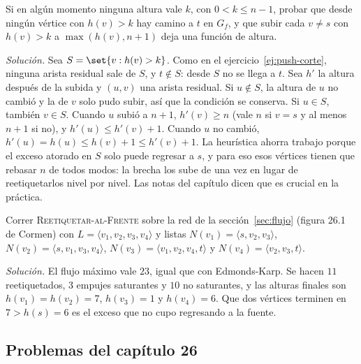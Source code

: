 \documentclass[11pt,letterpaper]{article}
\begin{document}
\begin{ejercicio}
  \label{ej:push-brecha}
  Si en algún momento ninguna altura vale $k$, con $0 < k \le n - 1$,
  probar que desde ningún vértice con $h(v) > k$ hay camino a $t$ en
  $G_f$, y que subir cada $v \neq s$ con $h(v) > k$ a
  $\max(h(v), n + 1)$ deja una función de altura.

  \textit{Solución.} Sea $S = \set{v : h(v) > k}$. Como en el
  ejercicio~\ref{ej:push-corte}, ninguna arista residual sale de $S$, y
  $t \notin S$: desde $S$ no se llega a $t$. Sea $h'$ la altura después
  de la subida y $(u, v)$ una arista residual. Si $u \notin S$, la
  altura de $u$ no cambió y la de $v$ solo pudo subir, así que la
  condición se conserva. Si $u \in S$, también $v \in S$. Cuando $u$
  subió a $n + 1$, $h'(v) \ge n$ (vale $n$ si $v = s$ y al menos
  $n + 1$ si no), y $h'(u) \le h'(v) + 1$. Cuando $u$ no cambió,
  $h'(u) = h(u) \le h(v) + 1 \le h'(v) + 1$. La heurística ahorra
  trabajo porque el exceso atorado en $S$ solo puede regresar a $s$, y
  para eso esos vértices tienen que rebasar $n$ de todos modos: la
  brecha los sube de una vez en lugar de reetiquetarlos nivel por
  nivel. Las notas del capítulo dicen que es crucial en la práctica.
\end{ejercicio}

\begin{ejercicio}[Cormen, 26.5-1]
  Correr \textsc{Reetiquetar-al-Frente} sobre la red de la
  sección~\ref{sec:flujo} (figura 26.1 de Cormen) con
  $L = \langle v_1, v_2, v_3, v_4\rangle$ y listas
  $N(v_1) = \langle s, v_2, v_3\rangle$,
  $N(v_2) = \langle s, v_1, v_3, v_4\rangle$,
  $N(v_3) = \langle v_1, v_2, v_4, t\rangle$ y
  $N(v_4) = \langle v_2, v_3, t\rangle$.

  \textit{Solución.} El flujo máximo vale $23$, igual que con
  Edmonds-Karp. Se hacen $11$ reetiquetados, $3$ empujes saturantes y
  $10$ no saturantes, y las alturas finales son
  $h(v_1) = h(v_2) = 7$, $h(v_3) = 1$ y $h(v_4) = 6$. Que dos vértices
  terminen en $7 > h(s) = 6$ es el exceso que no cupo regresando a la
  fuente.
\end{ejercicio}

\subsection*{Problemas del capítulo 26}
\end{document}
